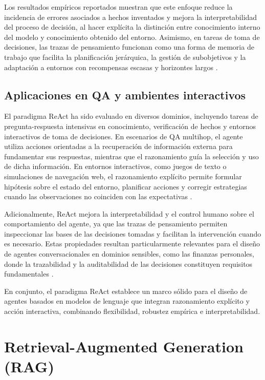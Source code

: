 \documentclass[
	spanish, %
	letterpaper, oneside
]{book}
\begin{document}
Los resultados empíricos reportados muestran que este enfoque reduce la incidencia de errores asociados a hechos inventados y mejora la interpretabilidad del proceso de decisión, al hacer explícita la distinción entre conocimiento interno del modelo y conocimiento obtenido del entorno. Asimismo, en tareas de toma de decisiones, las trazas de pensamiento funcionan como una forma de memoria de trabajo que facilita la planificación jerárquica, la gestión de subobjetivos y la adaptación a entornos con recompensas escasas y horizontes largos \cite{yao2023react}.

\subsection{Aplicaciones en QA y ambientes interactivos}

El paradigma ReAct ha sido evaluado en diversos dominios, incluyendo tareas de pregunta-respuesta intensivas en conocimiento, verificación de hechos y entornos interactivos de toma de decisiones. En escenarios de QA multihop, el agente utiliza acciones orientadas a la recuperación de información externa para fundamentar sus respuestas, mientras que el razonamiento guía la selección y uso de dicha información. En entornos interactivos, como juegos de texto o simulaciones de navegación web, el razonamiento explícito permite formular hipótesis sobre el estado del entorno, planificar acciones y corregir estrategias cuando las observaciones no coinciden con las expectativas \cite{yao2023react}.

Adicionalmente, ReAct mejora la interpretabilidad y el control humano sobre el comportamiento del agente, ya que las trazas de pensamiento permiten inspeccionar las bases de las decisiones tomadas y facilitan la intervención cuando es necesario. Estas propiedades resultan particularmente relevantes para el diseño de agentes conversacionales en dominios sensibles, como las finanzas personales, donde la trazabilidad y la auditabilidad de las decisiones constituyen requisitos fundamentales \cite{yao2023react}.

En conjunto, el paradigma ReAct establece un marco sólido para el diseño de agentes basados en modelos de lenguaje que integran razonamiento explícito y acción interactiva, combinando flexibilidad, robustez empírica e interpretabilidad.

\section{Retrieval-Augmented Generation (RAG)}
\end{document}
